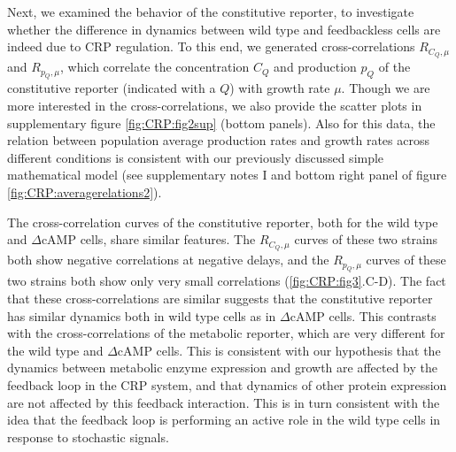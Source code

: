 Next, we examined the behavior of the constitutive reporter,
to investigate whether the difference in dynamics between wild type and feedbackless cells are indeed due to CRP regulation.
%
%
To this end, we generated cross-correlations $R_{C_Q,\mu}$ and $R_{p_Q,\mu}$, which correlate the concentration $C_Q$ and production $p_Q$ of the constitutive reporter (indicated with a $Q$) with growth rate $\mu$.
%
Though we are more interested in the cross-correlations, we also provide the scatter plots in supplementary figure \ref{fig:CRP:fig2sup} (bottom panels).
Also for this data,
the relation between population average production rates and growth rates across different conditions
is consistent with our previously discussed simple mathematical model (see supplementary notes I and bottom right panel of figure \ref{fig:CRP:averagerelations2}).


The cross-correlation curves of the constitutive reporter,
both for the wild type and $\Delta$cAMP cells,
share similar features.
%
The $R_{C_Q,\mu}$ curves of these two strains both show negative correlations at negative delays,
and the $R_{p_Q,\mu}$ curves of these two strains both show only very small correlations (\ref{fig:CRP:fig3}.C-D).
%
%
%
The fact that these cross-correlations are similar suggests 
that the constitutive reporter has similar dynamics both in wild type cells as in $\Delta$cAMP cells. 
%
This contrasts with the cross-correlations of the metabolic reporter, 
which are very different for the wild type and $\Delta$cAMP cells.
%
This is consistent with our hypothesis that the dynamics between metabolic enzyme expression and growth
are affected by the feedback loop in the CRP system, 
and that dynamics of other protein expression are not affected by this feedback interaction.
%
%
This is in turn consistent with the idea that the feedback loop is performing an active role in the wild type cells in response to stochastic signals.


